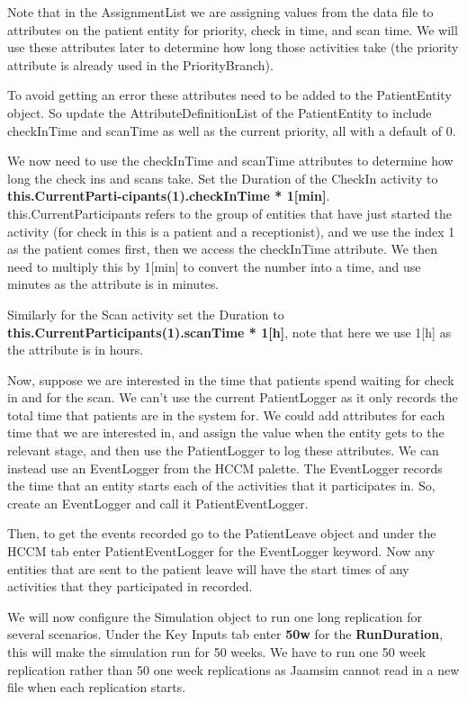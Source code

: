 \documentclass[
  10pt,
  a4paperpaper,
  DIV=11,
  numbers=noendperiod,
  oneside]{scrreprt}
\begin{document}
Note that in the AssignmentList we are assigning values from the data
file to attributes on the patient entity for priority, check in time,
and scan time. We will use these attributes later to determine how long
those activities take (the priority attribute is already used in the
PriorityBranch).

To avoid getting an error these attributes need to be added to the
PatientEntity object. So update the AttributeDefinitionList of the
PatientEntity to include checkInTime and scanTime as well as the current
priority, all with a default of 0.

We now need to use the checkInTime and scanTime attributes to determine
how long the check ins and scans take. Set the Duration of the CheckIn
activity to \textbf{this.CurrentParti-cipants(1).checkInTime *
1{[}min{]}}. this.CurrentParticipants refers to the group of entities
that have just started the activity (for check in this is a patient and
a receptionist), and we use the index 1 as the patient comes first, then
we access the checkInTime attribute. We then need to multiply this by
1{[}min{]} to convert the number into a time, and use minutes as the
attribute is in minutes.

Similarly for the Scan activity set the Duration to
\textbf{this.CurrentParticipants(1).scanTime * 1{[}h{]}}, note that here
we use 1{[}h{]} as the attribute is in hours.

Now, suppose we are interested in the time that patients spend waiting
for check in and for the scan. We can't use the current PatientLogger as
it only records the total time that patients are in the system for. We
could add attributes for each time that we are interested in, and assign
the value when the entity gets to the relevant stage, and then use the
PatientLogger to log these attributes. We can instead use an EventLogger
from the HCCM palette. The EventLogger records the time that an entity
starts each of the activities that it participates in. So, create an
EventLogger and call it PatientEventLogger.

Then, to get the events recorded go to the PatientLeave object and under
the HCCM tab enter PatientEventLogger for the EventLogger keyword. Now
any entities that are sent to the patient leave will have the start
times of any activities that they participated in recorded.

We will now configure the Simulation object to run one long replication
for several scenarios. Under the Key Inputs tab enter \textbf{50w} for
the \textbf{RunDuration}, this will make the simulation run for 50
weeks. We have to run one 50 week replication rather than 50 one week
replications as Jaamsim cannot read in a new file when each replication
starts.
\end{document}
